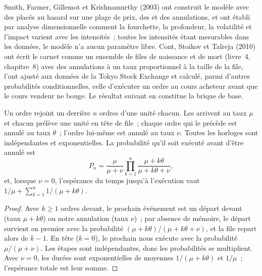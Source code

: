 Smith, Farmer, Gillemot et Krishnamurthy (2003) ont construit le modèle avec des  placés au hasard sur une plage de prix, des  et
des annulations, et ont établi par analyse dimensionnelle comment la fourchette, la profondeur, la volatilité et l'impact varient avec les intensités~; toutes les intensités étant mesurables
dans les données, le modèle n'a aucun paramètre libre. Cont, Stoikov et Talreja (2010) ont écrit le carnet comme un ensemble de files de naissance et de mort (livre~4, chapitre~8) avec
des annulations à un taux proportionnel à la taille de la file, l'ont ajusté aux données de la Tokyo Stock Exchange et calculé, parmi d'autres probabilités conditionnelles,
celle d'exécuter un ordre au cours acheteur avant que le cours vendeur ne bouge. Le résultat suivant en constitue la brique de base.

\begin{proposition}\label{prop:mx:the-limit-order-book:fill}
Un ordre rejoint un  derrière $n$ ordres d'une unité chacun. Les  arrivent au taux $\mu$ et chacun prélève une unité en tête de file~; chaque
ordre qui le précède est annulé au taux $\theta$~; l'ordre lui-même est annulé au taux $\nu$. Toutes les horloges sont indépendantes et exponentielles. La probabilité
qu'il soit exécuté avant d'être annulé est
\[
P_n=\frac{\mu}{\mu+\nu}\prod_{k=1}^{n}\frac{\mu+k\theta}{\mu+k\theta+\nu},
\]
et, lorsque $\nu=0$, l'espérance du temps jusqu'à l'exécution vaut $1/\mu+\sum_{k=1}^{n}1/(\mu+k\theta)$.
\end{proposition}

\begin{proof}
Avec $k\ge1$ ordres devant, le prochain événement est un départ devant (taux $\mu+k\theta$) ou notre annulation (taux $\nu$)~; par absence de mémoire, le
départ survient en premier avec la probabilité $(\mu+k\theta)/(\mu+k\theta+\nu)$, et la file repart alors de $k-1$. En tête ($k=0$), le prochain
 nous exécute avec la probabilité $\mu/(\mu+\nu)$. Les étapes sont indépendantes, donc les probabilités se multiplient. Avec $\nu=0$, les
durées sont exponentielles de moyennes $1/(\mu+k\theta)$ et $1/\mu$~; l'espérance totale est leur somme.
\end{proof}


